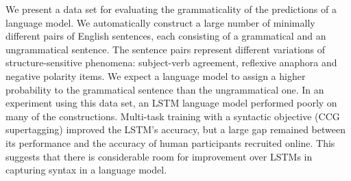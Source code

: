 We present a data set for evaluating the grammaticality of the predictions of a language model. We automatically construct a large number of minimally different pairs of English sentences, each consisting of a grammatical and an ungrammatical sentence. The sentence pairs represent different variations of structure-sensitive phenomena: subject-verb agreement, reflexive anaphora and negative polarity items. We expect a language model to assign a higher probability to the grammatical sentence than the ungrammatical one. In an experiment using this data set, an LSTM language model performed poorly on many of the constructions. Multi-task training with a syntactic objective (CCG supertagging) improved the LSTM's accuracy, but a large gap remained between its performance and the accuracy of human participants recruited online. This suggests that there is considerable room for improvement over LSTMs in capturing syntax in a language model.
